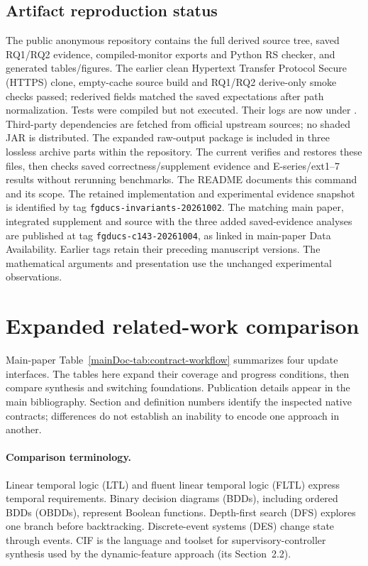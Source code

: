 \documentclass[11pt]{article}
\begin{document}
\subsection*{Artifact reproduction status}
The public anonymous repository contains the full derived source tree, saved RQ1/RQ2 evidence, compiled-monitor exports and Python RS checker, and generated tables/figures. The earlier clean Hypertext Transfer Protocol Secure (HTTPS) clone, empty-cache source build and RQ1/RQ2 derive-only smoke checks passed; rederived fields matched the saved expectations after path normalization. Tests were compiled but not executed. Their logs are now under . Third-party dependencies are fetched from official upstream sources; no shaded JAR is distributed. The expanded raw-output package is included in three lossless archive parts within the repository. The current  verifies and restores these files, then checks saved correctness/supplement evidence and E-series/ext1--7 results without rerunning benchmarks. The README documents this command and its scope. The retained implementation and experimental evidence snapshot is identified by tag \texttt{fgducs-invariants-20261002}. The matching main paper, integrated supplement and source with the three added saved-evidence analyses are published at tag \texttt{fgducs-c143-20261004}, as linked in main-paper Data Availability. Earlier tags retain their preceding manuscript versions. The mathematical arguments and presentation use the unchanged experimental observations.

\clearpage
\section{Expanded related-work comparison}
Main-paper Table~\ref{mainDoc-tab:contract-workflow} summarizes four update interfaces. The tables here expand their coverage and progress conditions, then compare synthesis and switching foundations. Publication details appear in the main bibliography. Section and definition numbers identify the inspected native contracts; differences do not establish an inability to encode one approach in another.

\paragraph{Comparison terminology.}
Linear temporal logic (LTL) and fluent linear temporal logic (FLTL) express temporal requirements. Binary decision diagrams (BDDs), including ordered BDDs (OBDDs), represent Boolean functions. Depth-first search (DFS) explores one branch before backtracking. Discrete-event systems (DES) change state through events. CIF is the language and toolset for supervisory-controller synthesis used by the dynamic-feature approach (its Section~2.2).
\end{document}
